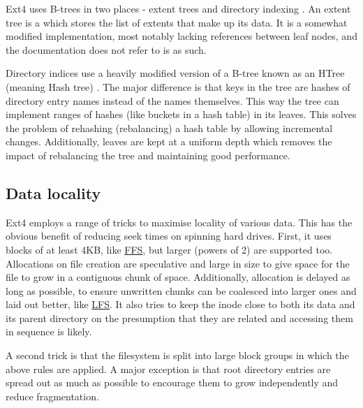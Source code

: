             Ext4 uses B-trees in two places - extent trees \cite{ext4_docs} and
            directory indexing \cite{HTree}. An extent tree is a \bplustree{} which
            stores the list of extents that make up its data. It is a somewhat
            modified implementation, most notably lacking references between
            leaf nodes, and the documentation does not refer to is as such.

            Directory indices use a heavily modified version of a B-tree known
            as an HTree (meaning Hash tree) \cite{HTree}. The major difference
            is that keys in the tree are hashes of directory entry names
            instead of the names themselves. This way the tree can implement
            ranges of hashes (like buckets in a hash table) in its leaves. This
            solves the problem of rehashing (rebalancing) a hash table by
            allowing incremental changes. Additionally, leaves are kept at a
            uniform depth which removes the impact of rebalancing the tree and
            maintaining good performance.

        \subsection{Data locality}
            \label{sec:locality}

            Ext4 employs a range of tricks to maximise locality of various
            data. This has the obvious benefit of reducing seek times on
            spinning hard drives. First, it uses blocks of at least 4KB, like \hyperref[sec:FFS]{FFS},
            but larger (powers of 2) are supported too. Allocations on file
            creation are speculative and large in size to give space for the
            file to grow in a contiguous chunk of space. Additionally,
            allocation is delayed as long as possible, to ensure unwritten
            chunks can be coalesced into larger ones and laid out better, like \hyperref[sec:LFS]{LFS}. It
            also tries to keep the inode close to both its data and its parent
            directory on the presumption that they are related and accessing
            them in sequence is likely.

            A second trick is that the filesystem is split into large block
            groups in which the above rules are applied. A major exception is
            that root directory entries are spread out as much as possible to
            encourage them to grow independently and reduce fragmentation.

